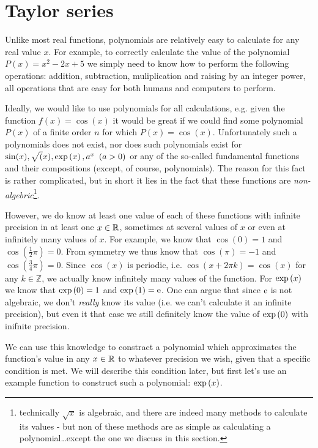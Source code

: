 \section{Taylor series}
Unlike most real functions, polynomials are relatively easy to calculate for any real value $x$. For example, to correctly calculate the value of the polynomial $P(x)=x^{2}-2x+5$ we simply need to know how to perform the following operations: addition, subtraction, muliplication and raising by an integer power, all operations that are easy for both humans and computers to perform.

Ideally, we would like to use polynomials for all calculations, e.g. given the function $f(x) = \cos(x)$ it would be great if we could find some polynomial $P(x)$ of a finite order $n$ for which $P(x)=\cos(x)$. Unfortunately such a polynomials does not exist, nor does such polynomials exist for $\sin(x), \sqrt(x), \exp\left(x\right), a^{x}\ \left(a>0\right)$ or any of the so-called fundamental functions and their compositions (except, of course, polynomials). The reason for this fact is rather complicated, but in short it lies in the fact that these functions are \textit{non-algebric}\footnote{technically $\sqrt{x}$ is algebraic, and there are indeed many methods to calculate its values - but non of these methods are as simple as calculating a polynomial\dots except the one we discuss in this section.}.

However, we do know at least one value of each of these functions with infinite precision in at least one $x\in\mathbb{R}^{}$, sometimes at several values of $x$ or even at infinitely many values of $x$. For example, we know that $\cos(0)=1$ and $\cos\left(\frac{1}{2}\pi\right)=0$. From symmetry we thus know that $\cos(\pi)=-1$ and $\cos\left(\frac{3}{4}\pi\right)=0$. Since $\cos(x)$ is periodic, i.e. $\cos\left(x+2\pi k\right)=\cos(x)$ for any $k\in\mathbb{Z}$, we actually know infinitely many values of the function. For $\exp\left(x\right)$ we know that $\exp\left(0\right)=1$ and $\exp\left(1\right)=\mathrm{e}$. One can argue that since $\mathrm{e}$ is not algebraic, we don't \textit{really} know its value (i.e. we can't calculate it an infinite precision), but even it that case we still definitely know the value of $\exp\left(0\right)$ with inifnite precision.

We can use this knowledge to constract a polynomial which approximates the function's value in any $x\in\mathbb{R}^{}$ to whatever precision we wish, given that a specific condition is met. We will describe this condition later, but first let's use an example function to construct such a polynomial: $\exp\left(x\right)$.
